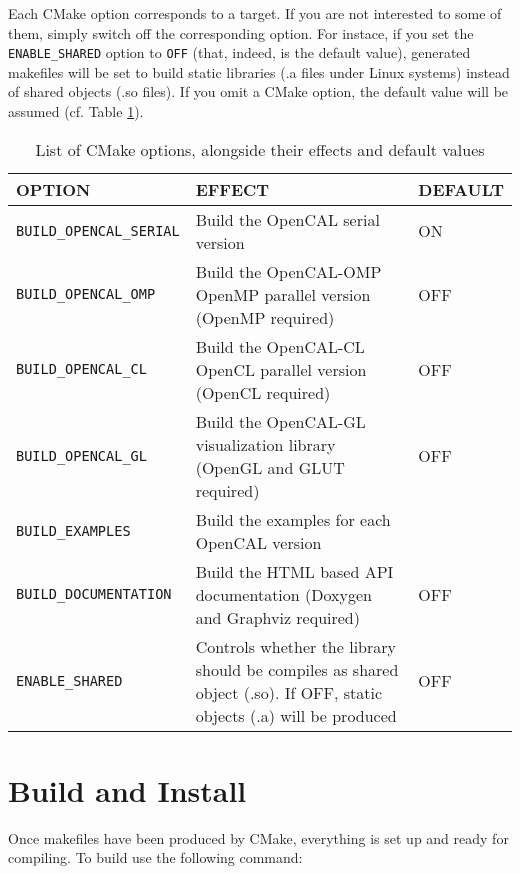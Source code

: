 Each CMake option corresponds to a target. If you are not interested
to some of them, simply switch off the corresponding option. For
instace, if you set the \verb'ENABLE_SHARED' option to \verb'OFF'
(that, indeed, is the default value), generated makefiles will be set
to build static libraries (.a files under Linux systems) instead of
shared objects (.so files). If you omit a CMake option, the default
value will be assumed (cf. Table \ref{ch:installation:cmakeoptions}).


\begin{table}[]
  \centering
  \caption{List of CMake options, alongside their effects and default
    values}
  \label{ch:installation:cmakeoptions}
  \begin{tabularx}{\textwidth}{lXl}
    \hline
    \textbf{OPTION} & \textbf{EFFECT} & \textbf{DEFAULT}\\
    \hline\hline
    \texttt{BUILD\_OPENCAL\_SERIAL} & Build the OpenCAL serial version  & ON   \\ \hline
    \texttt{BUILD\_OPENCAL\_OMP} &  Build the OpenCAL-OMP OpenMP parallel version (OpenMP required)    & OFF \\ \hline
    \texttt{BUILD\_OPENCAL\_CL} &  Build the OpenCAL-CL OpenCL parallel version (OpenCL required)     &OFF\\ \hline
    \texttt{BUILD\_OPENCAL\_GL} & Build the OpenCAL-GL visualization library (OpenGL and GLUT required)      &OFF \\ \hline
    \texttt{BUILD\_EXAMPLES} & Build the examples for each OpenCAL version      &\\ \hline
    \texttt{BUILD\_DOCUMENTATION}  &  Build the HTML based API documentation (Doxygen and Graphviz required)  & OFF   \\ \hline
    \texttt{ENABLE\_SHARED} &  Controls whether the library should be compiles as shared object (.so). If OFF, static objects (.a) will be produced & OFF\\ \hline
  \end{tabularx}
\end{table}


\section{Build and Install}
Once makefiles have been produced by CMake, everything is set up and
ready for compiling. To build use the following command:

